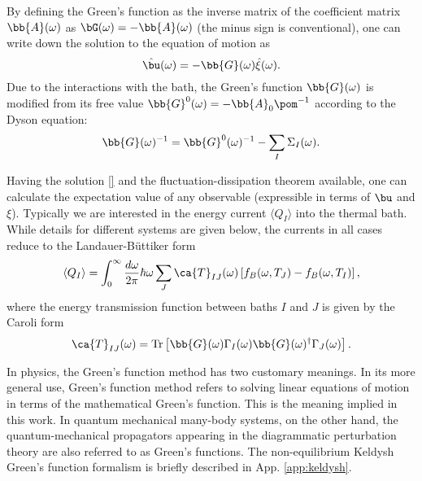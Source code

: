 By defining the Green's function as the inverse matrix of the coefficient matrix $\bb{A}(\omega)$ as $\bG(\omega)= -\bb{A}(\omega)$ (the minus sign is conventional), one can write down the solution to the equation of motion as
\begin{equation}
 \hat\bu(\omega) = - \bb{G}(\omega)\hat \xi(\omega).
\end{equation}
Due to the interactions with the bath, the Green's function $\bb{G}(\omega)$ is modified from its free value $\bb{G}^0(\omega)=-\bb{A}_0\pom ^{-1}$ according to the Dyson equation:
\begin{equation}
 \bb{G}(\omega) ^{-1} = \bb{G}^0(\omega)^{-1}-\sum_I \Sigma_I(\omega).
\end{equation}

Having the solution \eqref{} and the fluctuation-dissipation theorem available, one can calculate the expectation value of any observable (expressible in terms of $\bu$ and $\xi$). Typically we are interested in the energy current $\langle Q_I \rangle$ into the thermal bath. While details for different systems are given below, the currents in all cases reduce to the Landauer-B\"uttiker form
\begin{equation}
 \langle Q_I \rangle = \int_0^{\infty} \frac{d\omega}{2\pi} \hbar \omega \sum_J \ca{T}_{IJ}(\omega) \left[ f_B(\omega,T_J)-f_B(\omega,T_I)\right],
\end{equation}
where the energy transmission function between baths $I$ and $J$ is given by the Caroli form
\begin{equation}
 \ca{T}_{IJ}(\omega) = \textrm{Tr} \left[ \bb{G}(\omega) \Gamma_I(\omega) \bb{G}(\omega)^{\dagger} \Gamma_J(\omega) \right].
\end{equation}





\iffalse
In physics, the Green's function method has two customary meanings. In its more general use, Green's function method refers to solving linear equations of motion in terms of the mathematical Green's function. This is the meaning implied in this work. In quantum mechanical many-body systems, on the other hand, the quantum-mechanical propagators appearing in the diagrammatic perturbation theory are also referred to as Green's functions. The non-equilibrium Keldysh Green's function formalism is briefly described in App. \ref{app:keldysh}. 

